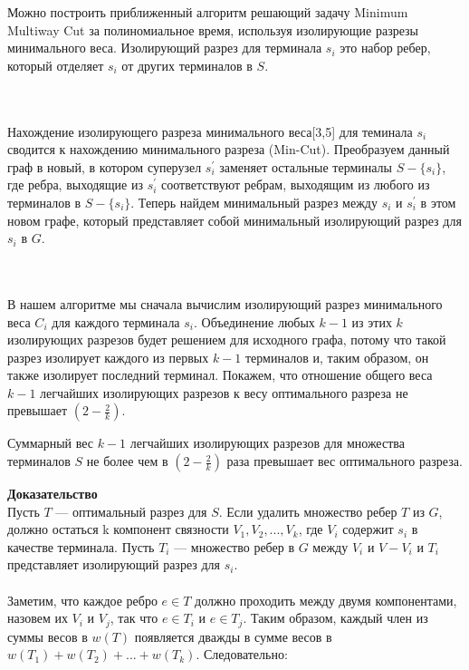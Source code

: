 Можно построить приближенный алгоритм решающий задачу Minimum Multiway Cut за полиномиальное время, используя изолирующие разрезы минимального веса. Изолирующий разрез для терминала \(s_i\) это набор ребер, который отделяет \(s_i\) от других терминалов в \(S\).

\\\\Нахождение изолирующего разреза минимального веса[3,5] для теминала \(s_i\) сводится к нахождению минимального разреза (Min-Cut). Преобразуем данный граф в новый, в котором суперузел \(s^{'}_i\) заменяет остальные
терминалы \(S-\{s_i\}\), где ребра, выходящие из \(s^{'}_i\)
соответствуют ребрам, выходящим из любого из терминалов в \(S-\{s_i\}\). Теперь найдем минимальный разрез между \(s_i\) и \(s^{'}_i\)
в этом новом графе, который представляет собой минимальный изолирующий разрез для \(s_i\)
в \(G\).

\\\\В нашем алгоритме мы сначала вычислим изолирующий разрез минимального веса \(C_i\) для каждого терминала \(s_i\). Объединение любых \(k-1\) из этих \(k\) изолирующих разрезов будет решением для исходного графа, потому что такой разрез изолирует каждого из первых \(k-1\) терминалов
и, таким образом, он также изолирует последний терминал. Покажем, что отношение общего веса
\(k-1\) легчайших изолирующих разрезов к весу оптимального разреза не превышает \((2-\frac{2}{k})\). 
\begin{theorem}
Суммарный вес \(k-1\) легчайших изолирующих разрезов для множества терминалов \(S\)
не более чем в \((2-\frac{2}{k})\) раза превышает вес оптимального разреза.
\end{theorem}
\textbf{Доказательство}
\\Пусть \(T\) — оптимальный разрез для \(S\). Если удалить множество ребер \(T\) из
\(G\), должно остаться k компонент связности \(V_1, V_2, . . . , V_k\), где \(V_i\) содержит \(s_i\) в качестве терминала. Пусть \(T_i\) — множество ребер в \(G\) между \(V_i\) и \(V-V_i\) и \(T_i\) представляет изолирующий разрез для \(s_i\).
\\\\Заметим, что каждое ребро \(e\in T\) должно проходить между двумя компонентами, назовем их \(V_i\) и \(V_j\), так что \(e\in T_i\) и \(e\in T_j\). Таким образом, каждый член из суммы весов в \(w(T)\) появляется дважды в сумме весов в \(w(T_1) + w(T_2) + . . . + w(T_k)\). Следовательно:

